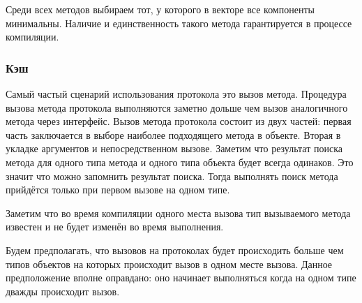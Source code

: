 Среди всех методов выбираем тот, у которого в векторе все компоненты минимальны. Наличие и единственность такого метода гарантируется в процессе компиляции.

\subsubsection{Кэш}
Самый частый сценарий использования протокола это вызов метода. Процедура вызова метода протокола выполняются заметно дольше чем вызов аналогичного метода через интерфейс. Вызов метода протокола состоит из двух частей: первая часть заключается в выборе наиболее подходящего метода в объекте. Вторая в укладке аргументов и непосредственном вызове. Заметим что результат поиска метода для одного типа метода и одного типа объекта будет всегда одинаков. Это значит что можно запомнить результат поиска. Тогда выполнять поиск метода прийдётся только при первом вызове на одном типе.

Заметим что во время компиляции одного места вызова тип вызываемого метода известен и не будет изменён во время выполнения.

Будем предполагать, что вызовов на протоколах будет происходить больше чем типов объектов на которых происходит вызов в одном месте вызова. Данное предположение вполне оправдано: оно начинает выполняться когда на одном типе дважды происходит вызов.
